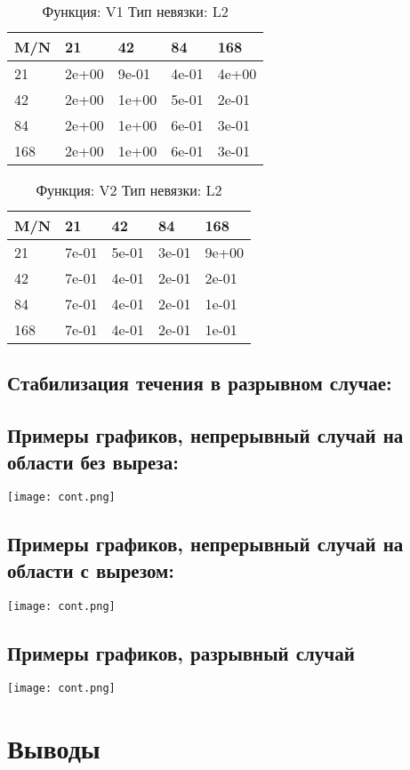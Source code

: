 \documentclass[a4paper,11pt]{article}
\begin{document}
\begin{table}[H]
\caption {Функция: V1 Тип невязки: L2  }
\begin{center}
\begin{tabular}{l|l|l|l|l}
\hline
M/N  & 21 & 42 & 84 & 168 \\ \hline
  21 & 2e+00& 9e-01& 4e-01& 4e+00\\ \hline
  42 & 2e+00& 1e+00& 5e-01& 2e-01\\ \hline
  84 & 2e+00& 1e+00& 6e-01& 3e-01\\ \hline
 168 & 2e+00& 1e+00& 6e-01& 3e-01\\ \hline
\end{tabular}
\end{center}
\end{table}
\begin{table}[H]
\caption {Функция: V2 Тип невязки: L2  }
\begin{center}
\begin{tabular}{l|l|l|l|l}
\hline
M/N  & 21 & 42 & 84 & 168 \\ \hline
  21 & 7e-01& 5e-01& 3e-01& 9e+00\\ \hline
  42 & 7e-01& 4e-01& 2e-01& 2e-01\\ \hline
  84 & 7e-01& 4e-01& 2e-01& 1e-01\\ \hline
 168 & 7e-01& 4e-01& 2e-01& 1e-01\\ \hline
\end{tabular}
\end{center}
\end{table}

\subsection{Стабилизация течения в разрывном случае:}

\subsection{Примеры графиков, непрерывный случай на области без выреза:}
\texttt{[image: cont.png]}

\subsection{Примеры графиков, непрерывный случай на области с вырезом:}
\texttt{[image: cont.png]}

\subsection{Примеры графиков, разрывный случай}
\texttt{[image: cont.png]}

\section{Выводы}
\end{document}
